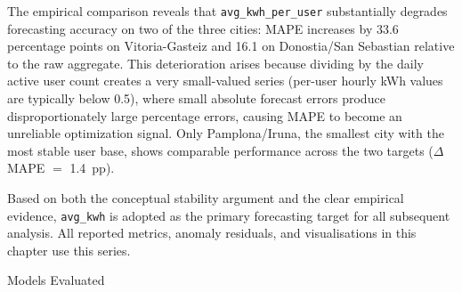 ﻿\documentclass[12pt,reqno, twoside]{amsbook}
\makeatletter
\numberwithin{figure}{chapter}
\numberwithin{table}{chapter}
\numberwithin{equation}{chapter}
\def\subsection{\@startsection{subsection}{2}%
      \z@{.5\linespacing\@plus.7\linespacing}{.25\linespacing}%
      {\normalfont\bfseries\flushleft}}
\theoremstyle{plain}
\numberwithin{equation}{chapter}
\numberwithin{section}{chapter}
\makeatother
\begin{document}
\begin{table}[htbp]
\centering
\caption{\ac{MAPE} comparison between \texttt{avg\_kwh\_per\_user} and \texttt{avg\_kwh}}
\label{tab:target_comparison}
\end{table}

The empirical comparison reveals that \texttt{avg\_kwh\_per\_user} substantially degrades forecasting accuracy on two of the three cities: \ac{MAPE} increases by 33.6 percentage points on Vitoria-Gasteiz and 16.1 on Donostia/San Sebastian relative to the raw aggregate. This deterioration arises because dividing by the daily active user count creates a very small-valued series (per-user hourly kWh values are typically below 0.5), where small absolute forecast errors produce disproportionately large percentage errors, causing \ac{MAPE} to become an unreliable optimization signal. Only Pamplona/Iruna, the smallest city with the most stable user base, shows comparable performance across the two targets ($\Delta$\ac{MAPE} $=$ 1.4~\ac{pp}).

Based on both the conceptual stability argument and the clear empirical evidence, \texttt{avg\_kwh} is adopted as the primary forecasting target for all subsequent analysis. All reported metrics, anomaly residuals, and visualisations in this chapter use this series.

\subsection{Models Evaluated}
\end{document}
